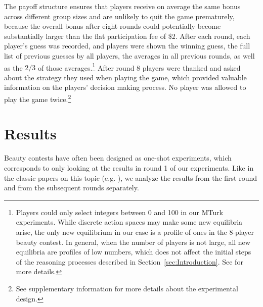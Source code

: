 \documentclass[12pt,review]{elsarticle}
\begin{document}
The payoff structure ensures that players receive on average the same bonus across different group sizes and are unlikely to quit the game prematurely, because the overall bonus after eight rounds could potentially become substantially larger than the flat participation fee of \$2. After each round, each player's guess was recorded, and players were shown the winning guess, the full list of previous guesses by all players, the averages in all previous rounds, as well as the $2/3$ of those averages.\footnote{Players could only select integers between 0 and 100 in our MTurk experiments. While discrete action spaces may make some new equilibria arise, the only new equilibrium in our case is a profile of ones in the 8-player beauty contest. In general, when the number of players is not large, all new equilibria are profiles of low numbers, which does not affect the initial steps of the reasoning processes described in Section~\ref{sec:Introduction}. See \citet{SeelTsakas17} for more details.} After round 8 players were thanked and asked about the strategy they used when playing the game, which provided valuable information on the players\textquoteright{} decision making process. No player was allowed to play the game twice.\footnote{See supplementary information for more details about the experimental design.}

\section{Results\label{sec:Results}}
\noindent
Beauty contests have often been designed as one-shot experiments, which corresponds to only looking at the results in round 1 of our experiments. Like in the classic papers on this topic (e.g. \citet{Nagel95, HoCamererWeigelt98}), we analyze the results from the first round and from the subsequent rounds separately.
\end{document}
